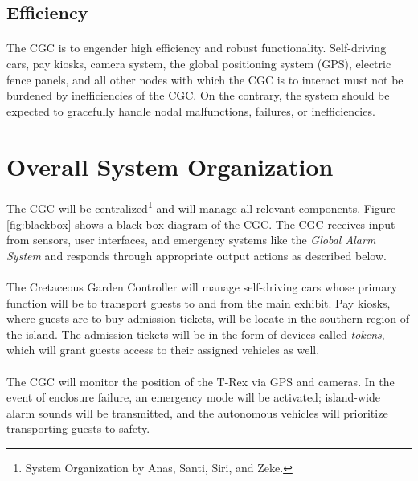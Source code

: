 \documentclass[12pt]{article}
\begin{document}
    \subsection{Efficiency}\label{eff}
    \paragraph{} The CGC is to engender high efficiency and robust functionality. 
    Self-driving cars, pay kiosks, camera system, the global positioning system (GPS), 
    electric fence panels, and all other nodes with which the CGC is to interact 
    must not be burdened by inefficiencies of the CGC. On the contrary, the system
    should be expected to gracefully handle nodal malfunctions, failures, or
    inefficiencies.




\section{Overall System Organization} \label{sys}
\paragraph{} The CGC will be centralized\footnote{System Organization 
by Anas, Santi, Siri, and Zeke.} and will manage all relevant components. Figure 
\ref{fig:blackbox} shows a black box diagram of the CGC. The CGC receives input 
from sensors, user interfaces, and emergency systems like the \textit{Global 
Alarm System} and responds through appropriate output actions as described 
below.

\paragraph{} The Cretaceous Garden Controller will manage self-driving cars whose primary
function will be to transport guests to and from the main exhibit. Pay kiosks, where guests 
are to buy admission tickets, will be locate in the southern region of the island. The admission 
tickets will be in the form of devices called \textit{tokens}, which will grant guests 
access to their assigned vehicles as well.

\paragraph{} The CGC will monitor the position of the T-Rex via GPS and
cameras. In the event of enclosure failure, an emergency mode will be activated;
island-wide alarm sounds will be transmitted, and the autonomous vehicles will
prioritize transporting guests to safety.
\end{document}
